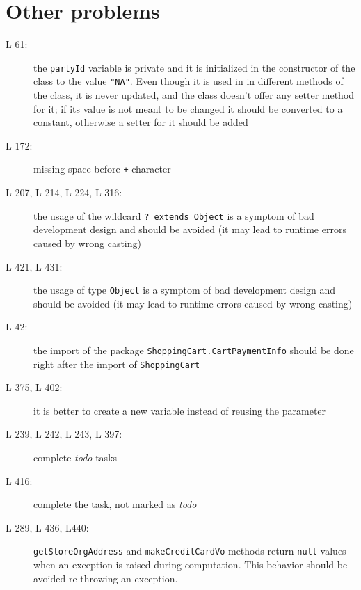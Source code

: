 \section{Other problems}
\begin{description}
	\item[L 61:] the {\tt partyId} variable is private and it is initialized in the constructor of the class to the value {\tt "\textunderscore NA\textunderscore"}. Even though it is used in in different methods of the class, it is never updated, and the class doesn't offer any setter method for it; if its value is not meant to be changed it should be converted to a constant, otherwise a setter for it should be added
	\item[L 172:] missing space before {\tt +} character
	\item[L 207, L 214, L 224, L 316:] the usage of the wildcard {\tt ? extends Object} is a symptom of bad development design and should be avoided (it may lead to runtime errors caused by wrong casting)
	\item[L 421, L 431:] the usage of type {\tt Object} is a symptom of bad development design and should be avoided (it may lead to runtime errors caused by wrong casting)
	\item[L 42:] the import of the package {\tt ShoppingCart.CartPaymentInfo} should be done right after the import of {\tt ShoppingCart}
	\item[L 375, L 402:] it is better to create a new variable instead of reusing the parameter
	\item[L 239, L 242, L 243, L 397:]  complete \emph{todo} tasks
	\item[L 416:] complete the task, not marked as \emph{todo}
	\item[L 289, L 436, L440:] {\tt getStoreOrgAddress} and {\tt makeCreditCardVo} methods return {\tt null} values when an exception is raised during computation. This behavior should be avoided re-throwing an exception.
\end{description}